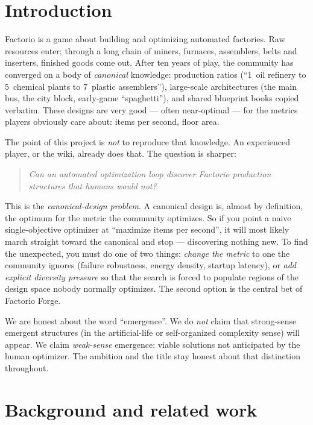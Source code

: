 \documentclass[11pt,a4paper]{article}
\begin{document}
\section{Introduction}
\label{sec:intro}

Factorio is a game about building and optimizing automated factories. Raw
resources enter; through a long chain of miners, furnaces, assemblers, belts and
inserters, finished goods come out. After ten years of play, the community has
converged on a body of \emph{canonical} knowledge: production ratios
(``1~oil refinery to 5~chemical plants to 7~plastic assemblers''), large-scale
architectures (the main bus, the city block, early-game ``spaghetti''), and
shared blueprint books copied verbatim. These designs are very good --- often
near-optimal --- for the metrics players obviously care about: items per second,
floor area.

The point of this project is \emph{not} to reproduce that knowledge. An
experienced player, or the wiki, already does that. The question is sharper:

\begin{quote}
\itshape Can an automated optimization loop discover Factorio production
structures that humans would not?
\end{quote}

This is the \emph{canonical-design problem}. A canonical design is, almost by
definition, the optimum for the metric the community optimizes. So if you point a
naive single-objective optimizer at ``maximize items per second'', it will most
likely march straight toward the canonical and stop --- discovering nothing new.
To find the unexpected, you must do one of two things: \emph{change the metric}
to one the community ignores (failure robustness, energy density, startup
latency), or \emph{add explicit diversity pressure} so that the search is forced
to populate regions of the design space nobody normally optimizes. The second
option is the central bet of Factorio Forge.

We are honest about the word ``emergence''. We do \emph{not} claim that
strong-sense emergent structures (in the artificial-life or self-organized
complexity sense) will appear. We claim \emph{weak-sense} emergence: viable
solutions not anticipated by the human optimizer. The ambition and the title
stay honest about that distinction throughout.

\section{Background and related work}
\label{sec:background}
\end{document}
